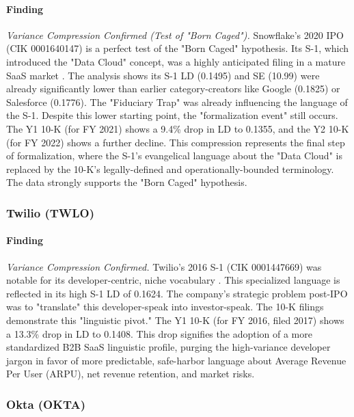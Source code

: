 \documentclass[12pt, letterpaper]{article}
\begin{document}
\paragraph{Finding} \textit{Variance Compression Confirmed (Test of "Born Caged").}
Snowflake's 2020 IPO (CIK 0001640147) is a perfect test of the "Born Caged" hypothesis. Its S-1, which introduced the "Data Cloud" concept, was a highly anticipated filing in a mature SaaS market \cite{key3}. The analysis shows its S-1 LD (0.1495) and SE (10.99) were already significantly lower than earlier category-creators like Google (0.1825) or Salesforce (0.1776). The "Fiduciary Trap" was already influencing the language of the S-1. Despite this lower starting point, the "formalization event" still occurs. The Y1 10-K (for FY 2021) \cite{key44, key45} shows a 9.4\% drop in LD to 0.1355, and the Y2 10-K (for FY 2022) \cite{key46, key47} shows a further decline. This compression represents the final step of formalization, where the S-1's evangelical language about the "Data Cloud" is replaced by the 10-K's legally-defined and operationally-bounded terminology. The data strongly supports the "Born Caged" hypothesis.

\subsubsection{Twilio (TWLO)}
\paragraph{Finding} \textit{Variance Compression Confirmed.}
Twilio's 2016 S-1 (CIK 0001447669) was notable for its developer-centric, niche vocabulary \cite{key15, key48}. This specialized language is reflected in its high S-1 LD of 0.1624. The company's strategic problem post-IPO was to "translate" this developer-speak into investor-speak. The 10-K filings demonstrate this "linguistic pivot." The Y1 10-K (for FY 2016, filed 2017) \cite{key49} shows a 13.3\% drop in LD to 0.1408. This drop signifies the adoption of a more standardized B2B SaaS linguistic profile, purging the high-variance developer jargon in favor of more predictable, safe-harbor language about Average Revenue Per User (ARPU), net revenue retention, and market risks.

\subsubsection{Okta (OKTA)}
\end{document}
